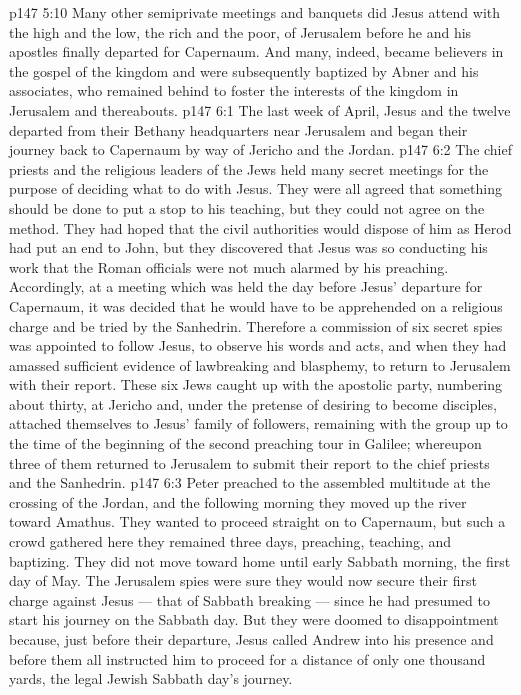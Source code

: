 \vs p147 5:10 \pc Many other semiprivate meetings and banquets did Jesus attend with the high and the low, the rich and the poor, of Jerusalem before he and his apostles finally departed for Capernaum. And many, indeed, became believers in the gospel of the kingdom and were subsequently baptized by Abner and his associates, who remained behind to foster the interests of the kingdom in Jerusalem and thereabouts.
\vs p147 6:1 The last week of April, Jesus and the twelve departed from their Bethany headquarters near Jerusalem and began their journey back to Capernaum by way of Jericho and the Jordan.
\vs p147 6:2 The chief priests and the religious leaders of the Jews held many secret meetings for the purpose of deciding what to do with Jesus. They were all agreed that something should be done to put a stop to his teaching, but they could not agree on the method. They had hoped that the civil authorities would dispose of him as Herod had put an end to John, but they discovered that Jesus was so conducting his work that the Roman officials were not much alarmed by his preaching. Accordingly, at a meeting which was held the day before Jesus’ departure for Capernaum, it was decided that he would have to be apprehended on a religious charge and be tried by the Sanhedrin. Therefore a commission of six secret spies was appointed to follow Jesus, to observe his words and acts, and when they had amassed sufficient evidence of lawbreaking and blasphemy, to return to Jerusalem with their report. These six Jews caught up with the apostolic party, numbering about thirty, at Jericho and, under the pretense of desiring to become disciples, attached themselves to Jesus’ family of followers, remaining with the group up to the time of the beginning of the second preaching tour in Galilee; whereupon three of them returned to Jerusalem to submit their report to the chief priests and the Sanhedrin.
\vs p147 6:3 \pc Peter preached to the assembled multitude at the crossing of the Jordan, and the following morning they moved up the river toward Amathus. They wanted to proceed straight on to Capernaum, but such a crowd gathered here they remained three days, preaching, teaching, and baptizing. They did not move toward home until early Sabbath morning, the first day of May. The Jerusalem spies were sure they would now secure their first charge against Jesus --- that of Sabbath breaking --- since he had presumed to start his journey on the Sabbath day. But they were doomed to disappointment because, just before their departure, Jesus called Andrew into his presence and before them all instructed him to proceed for a distance of only one thousand yards, the legal Jewish Sabbath day’s journey.
